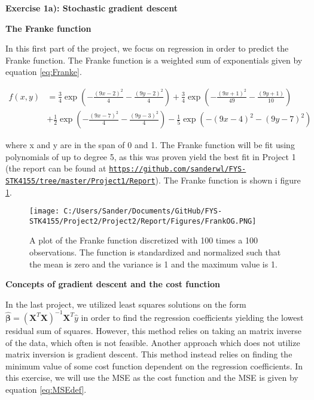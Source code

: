 \documentclass[12pt,a4paper]{article}
\begin{document}
\newpage

\begin{center}
\Large{\textbf{Exercise 1a): Stochastic gradient descent}}
\end{center}

\begin{center}
\large{\textbf{The Franke function}}
\end{center}

\noindent In this first part of the project, we focus on regression in order to predict the Franke function. The Franke function is a weighted sum of exponentials given by equation \ref{eq:Franke}.

\begin{equation}\label{eq:Franke}
\begin{aligned}
f(x,y) &= \frac{3}{4}\exp{\left(-\frac{(9x-2)^2}{4} - \frac{(9y-2)^2}{4}\right)}+\frac{3}{4}\exp{\left(-\frac{(9x+1)^2}{49}- \frac{(9y+1)}{10}\right)} \\
&+\frac{1}{2}\exp{\left(-\frac{(9x-7)^2}{4} - \frac{(9y-3)^2}{4}\right)} -\frac{1}{5}\exp{\left(-(9x-4)^2 - (9y-7)^2\right) }
\end{aligned}
\end{equation}

\noindent where x and y are in the span of 0 and 1. The Franke function will be fit using polynomials of up to degree 5, as this was proven yield the best fit in Project 1 (the report can be found at \href{{https://github.com/sanderwl/FYS-STK4155/tree/master/Project1/Report}}{\nolinkurl{https://github.com/sanderwl/FYS-STK4155/tree/master/Project1/Report}}). The Franke function is shown i figure \ref{fig:Franke}.

\begin{figure}[H]
\centering
\texttt{[image: C:/Users/Sander/Documents/GitHub/FYS-STK4155/Project2/Project2/Report/Figures/FrankOG.PNG]}
\caption{\label{fig:Franke} A plot of the Franke function discretized with 100 times a 100 observations. The function is standardized and normalized such that the mean is zero and the variance is 1 and the maximum value is 1.}
\end{figure}

\begin{center}
\large{\textbf{Concepts of gradient descent and the cost function}}
\end{center}

\noindent In the last project, we utilized least squares solutions on the form $\boldsymbol{\hat{\beta}} = (\textbf{X}^T\textbf{X})^{-1}\textbf{X}^T\hat{y}$ in order to find the regression coefficients yielding the lowest residual sum of squares. However, this method relies on taking an matrix inverse of the data, which often is not feasible. Another approach which does not utilize matrix inversion is gradient descent. This method instead relies on finding the minimum value of some cost function dependent on the regression coefficients. In this exercise, we will use the MSE as the cost function and the MSE is given by equation \ref{eq:MSEdef}.
\end{document}

